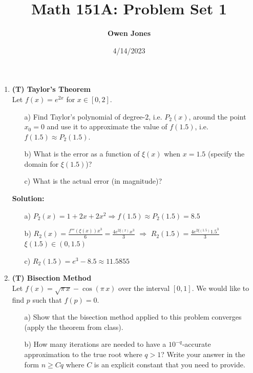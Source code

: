 \documentclass[12pt]{article}
\title{\bf Math 151A: Problem Set 1}
\date{4/14/2023}
\author{\bf Owen Jones}
\begin{document}
\maketitle

\begin{enumerate}[label=\bfseries Problem \arabic*:]


    
    \item \textbf{(T) Taylor's Theorem}\\
    Let $f(x)=e^{2x}$ for $x\in[0,2]$.
    
    \begin{itemize} 
    \item[a)] Find Taylor's polynomial of degree-$2$, i.e. $P_2(x)$, around the point $x_0=0$ and use it to approximate the value of $f(1.5)$, i.e. $f(1.5)\approx P_2(1.5)$. 
    
    \item[b)]  What is the error as a function of $\xi(x)$ when $x=1.5$ (specify the domain for $\xi(1.5)$)?
    
    \item[c)]  What is the actual error (in magnitude)?
    
    \end{itemize}
    
    \textbf{Solution:}

    \begin{itemize}
    \item[a)] $P_2(x)=1+2x+2x^2 \Rightarrow f(1.5)\approx P_2(1.5)=8.5$
    
    \item[b)] $R_2(x)=\frac{f'''(\xi(x))x^3}{6}=\frac{4e^{2\xi(x)}x^3}{3}$ $\Rightarrow$ $R_2(1.5)=\frac{4e^{2\xi(1.5)}1.5^3}{3}$ $\xi(1.5)\in(0,1.5)$

    \item[c)] $R_2(1.5)=e^3-8.5\approx11.5855$

    \end{itemize}

    \newpage
    \item \textbf{(T) Bisection Method}\\
    Let $f(x)=\sqrt{\pi\, x}-\cos(\pi\, x)$  over the interval $[0,1]$.  We would like to find $p$ such that $f(p)=0$.
    \begin{itemize}
    \item[a)] Show that the bisection method applied to this problem converges (apply the theorem from class).   
    \item[b)] How many iterations are needed to have a $10^{-q}$-accurate approximation to the true root where $q>1$? Write your answer in the form $n\geq C q$ where $C$ is an explicit constant that you need to provide.  
     

\end{itemize}
\end{enumerate}
\end{document}
